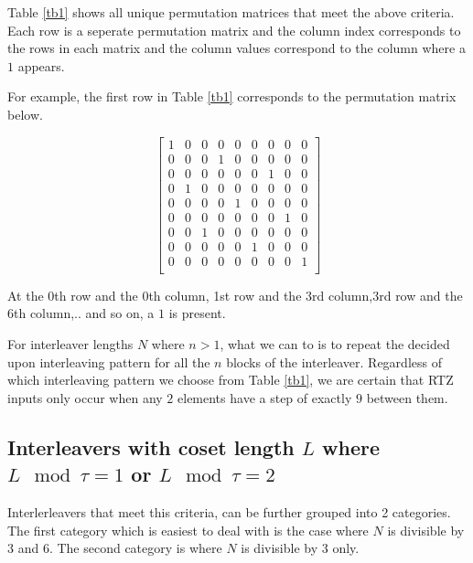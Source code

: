 \documentclass[11pt, oneside, dvipdfmx]{book}
\begin{document}
 Table \ref{tb1} shows all unique permutation matrices that meet the above criteria. Each row is a seperate permutation matrix and the column index corresponds to the rows in each matrix and the column values correspond to the column where a $1$ appears.
 
 For example, the first row in Table \ref{tb1} corresponds to the permutation matrix below.
 
 \begin{equation}
 \begin{bmatrix}
1 & 0 & 0 & 0 & 0 & 0 & 0 & 0 & 0 \\
0 & 0 & 0 & 1 & 0 & 0 & 0 & 0 & 0 \\
0 & 0 & 0 & 0 & 0 & 0 & 1 & 0 & 0 \\
0 & 1 & 0 & 0 & 0 & 0 & 0 & 0 & 0 \\
0 & 0 & 0 & 0 & 1 & 0 & 0 & 0 & 0 \\
0 & 0 & 0 & 0 & 0 & 0 & 0 & 1 & 0 \\
0 & 0 & 1 & 0 & 0 & 0 & 0 & 0 & 0 \\
0 & 0 & 0 & 0 & 0 & 1 & 0 & 0 & 0 \\
0 & 0 & 0 & 0 & 0 & 0 & 0 & 0 & 1 \\
\end{bmatrix}
\end{equation}

At the 0th row and the 0th column, 1st row and the 3rd column,3rd row and the 6th column,.. and so on, a $1$ is present.

For interleaver lengths $N$ where $n>1$, what we can to is to repeat the decided upon interleaving pattern for all the $n$ blocks of the interleaver. Regardless of which interleaving pattern we choose from Table \ref{tb1}, we are certain that RTZ inputs only occur when any $2$ elements have a step of exactly $9$ between them. 


 \subsection{Interleavers with coset length $L$ where $L \mod \tau =1$ or $L \mod \tau =2$}
 Interlerleavers that meet this criteria, can be further grouped into 2 categories. The first category which is easiest to deal with is the case where $N$ is divisible by $3$ and $6$. The second category is where $N $ is divisible by 3 only.
 
\end{document}
